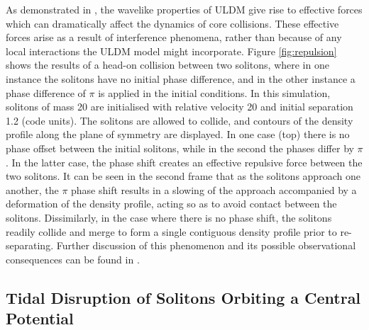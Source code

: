 \documentclass[a4paper,11pt]{article}
\begin{document}
As demonstrated in \cite{Paredes:2015wga}, the wavelike properties of ULDM give rise to effective forces which can dramatically affect the dynamics of core collisions. These effective forces arise as a result of interference phenomena, rather than because of any local interactions the ULDM model might  incorporate.  Figure \ref{fig:repulsion} shows the results of a head-on collision between two solitons, where in one instance the solitons have no initial phase difference, and in the other instance a phase difference of $\pi$ is applied in the initial conditions. In this simulation, solitons of mass 20 are initialised with relative velocity 20 and initial separation 1.2 (code units). The solitons are allowed to collide, and contours of the density profile along the plane of symmetry are displayed. In one case (top) there is no phase offset between the initial solitons, while in the second the phases differ by $\pi$. In the latter case, the phase shift creates an effective repulsive force between the two solitons. It can be seen in the second frame that as the solitons approach one another, the $\pi$ phase shift results in a slowing of the approach accompanied by a deformation of the density profile, acting so as to avoid contact between the solitons. Dissimilarly, in the case where there is no phase shift, the solitons readily collide and merge to form a single contiguous density profile prior to re-separating. Further discussion of this phenomenon and its possible observational consequences can be found in \cite{Paredes:2015wga}.


\vspace{1em}

\subsection{Tidal Disruption of Solitons Orbiting a Central Potential}\label{sec:disruption}
\end{document}
